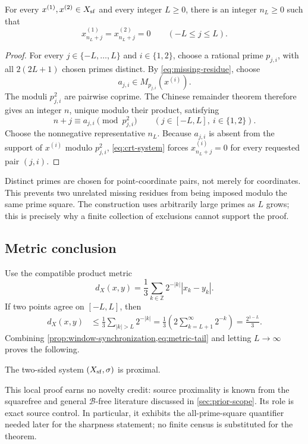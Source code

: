 \begin{proposition}
\label{prop:window-synchronization}
For every \(x^{(1)},x^{(2)}\in X_{\mathrm{sf}}\) and every integer \(L\geq0\), there is
an integer \(n_L\geq0\) such that
\[
  x^{(1)}_{n_L+j}=x^{(2)}_{n_L+j}=0
  \qquad(-L\leq j\leq L).
\]
\end{proposition}

\begin{proof}
For every \(j\in\{-L,\ldots,L\}\) and \(i\in\{1,2\}\), choose a rational
prime \(p_{j,i}\), with all \(2(2L+1)\) chosen primes distinct.  By
\cref{eq:missing-residue}, choose
\[
  a_{j,i}\in M_{p_{j,i}}(x^{(i)}).
\]
The moduli \(p_{j,i}^2\) are pairwise coprime.  The Chinese remainder theorem
therefore gives an integer \(n\), unique modulo their product, satisfying
\begin{equation}
  n+j\equiv a_{j,i}\pmod{p_{j,i}^2}
  \qquad(j\in[-L,L],\ i\in\{1,2\}).
  \label{eq:crt-system}
\end{equation}
Choose the nonnegative representative \(n_L\).  Because
\(a_{j,i}\) is absent from the support of \(x^{(i)}\) modulo
\(p_{j,i}^2\), \cref{eq:crt-system} forces
\(x^{(i)}_{n_L+j}=0\) for every requested pair \((j,i)\).
\end{proof}

Distinct primes are chosen for point-coordinate pairs, not merely for
coordinates.  This prevents two unrelated missing residues from being
imposed modulo the same prime square.  The construction uses arbitrarily
large primes as \(L\) grows; this is precisely why a finite collection of
exclusions cannot support the proof.

\subsection{Metric conclusion}

Use the compatible product metric
\begin{equation}
  d_X(x,y)=\frac13\sum_{k\in\mathbb Z}
  2^{-|k|}|x_k-y_k|.
  \label{eq:product-metric}
\end{equation}
If two points agree on \([-L,L]\), then
\begin{align}
  d_X(x,y)
  &\leq \frac13\sum_{|k|>L}2^{-|k|}
   =\frac13\left(2\sum_{k=L+1}^{\infty}2^{-k}\right)
   =\frac{2^{1-L}}{3}.
  \label{eq:metric-tail}
\end{align}
Combining \cref{prop:window-synchronization,eq:metric-tail} and letting
\(L\to\infty\) proves the following.

\begin{corollary}
\label{cor:source-proximal}
The two-sided system \((X_{\mathrm{sf}},\sigma)\) is proximal.
\end{corollary}

This local proof earns no novelty credit: source proximality is known from
the squarefree and general \(\mathscr B\)-free literature discussed in
\cref{sec:prior-scope}.  Its role is exact source control.  In particular,
it exhibits the all-prime-square quantifier needed later for the sharpness
statement; no finite census is substituted for the theorem.

